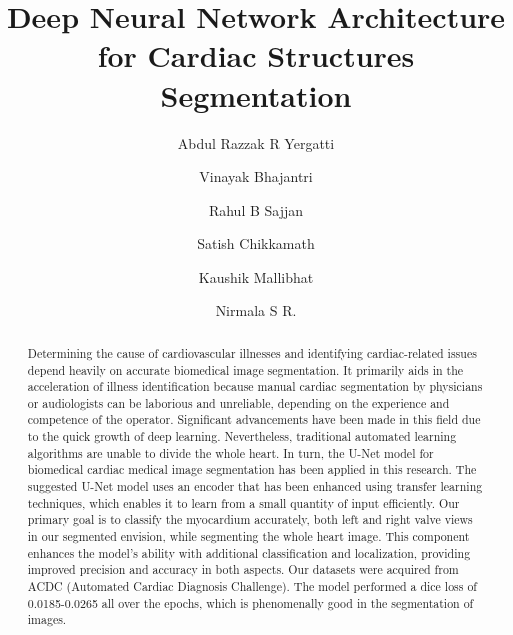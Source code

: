 \documentclass[runningheads]{llncs}
\begin{document}
%
\title{Deep Neural Network Architecture for Cardiac Structures Segmentation}
%
%
\author{Abdul Razzak R Yergatti\and
Vinayak Bhajantri\and
Rahul B Sajjan\and
Satish Chikkamath\and
Kaushik Mallibhat\and 
Nirmala S R.
}

\authorrunning{}
%

\maketitle           %
%
\begin{abstract}
Determining the cause of cardiovascular illnesses and identifying cardiac-related issues depend heavily on accurate biomedical image segmentation. It primarily aids in the acceleration of illness identification because manual cardiac segmentation by physicians or audiologists can be laborious and unreliable, depending on the experience and competence of the operator. Significant advancements have been made in this field due to the quick growth of deep learning. Nevertheless, traditional automated learning algorithms are unable to divide the whole heart. In turn, the U-Net model for biomedical cardiac medical image segmentation has been applied in this research. The suggested U-Net model uses an encoder that has been enhanced using transfer learning techniques, which enables it to learn from a small quantity of input efficiently. Our primary goal is to classify the myocardium accurately, both left and right valve views in our segmented envision, while segmenting the whole heart image. This component enhances the model’s ability with additional classification and localization, providing improved precision and accuracy in both aspects. Our datasets were acquired from ACDC (Automated Cardiac Diagnosis Challenge). The model performed a dice loss of 0.0185-0.0265 all over the epochs, which is phenomenally good in the segmentation of images.

\end{abstract}
%
%
%
\end{document}
